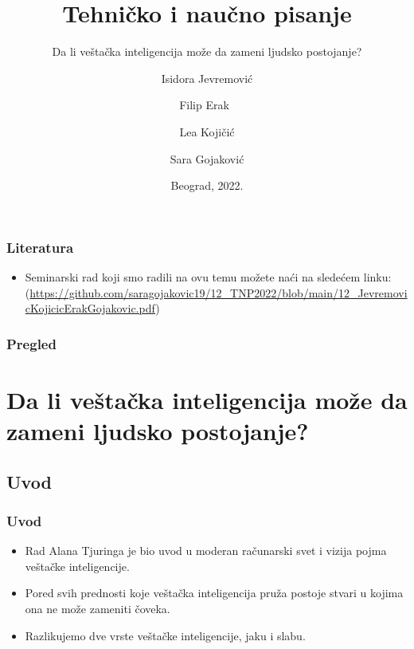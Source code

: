 \documentclass{beamer}
\title{Tehničko i naučno pisanje}
\subtitle{Da li veštačka inteligencija može da zameni ljudsko postojanje?}
\author{Isidora Jevremović \and Filip Erak\ \and Lea Kojičić \and Sara Gojaković}
\institute{Matematički fakultet\\Univerzitet u Beogradu}
\date{
	\footnotesize{Beograd, 2022.}	
}
\begin{document}
\begin{frame}
	\thispagestyle{empty}
	\titlepage
\end{frame}

\addtocounter{framenumber}{-1}

\begin{frame}[fragile]\frametitle{Literatura}
	\begin{itemize}
		\item Seminarski rad koji smo radili na ovu temu možete naći na sledećem linku:
		(\url{https://github.com/saragojakovic19/12_TNP2022/blob/main/12_JevremovicKojicicErakGojakovic.pdf})
	\end{itemize}
\end{frame}

\begin{frame}
	\frametitle{Pregled} %
	\tableofcontents[] 
\end{frame}
\section{Da li veštačka inteligencija može da zameni ljudsko postojanje?}

\subsection{Uvod}

\begin{frame}[fragile]\frametitle{Uvod}
	\begin{itemize}	
		\item Rad Alana Tjuringa je bio uvod u moderan računarski svet i vizija pojma veštačke inteligencije.
		\item Pored svih prednosti koje veštačka inteligencija pruža postoje stvari u kojima ona ne može zameniti čoveka.
       \item Razlikujemo dve vrste veštačke inteligencije, jaku i slabu.
	\end{itemize}
 

 
\end{frame}
\end{document}
